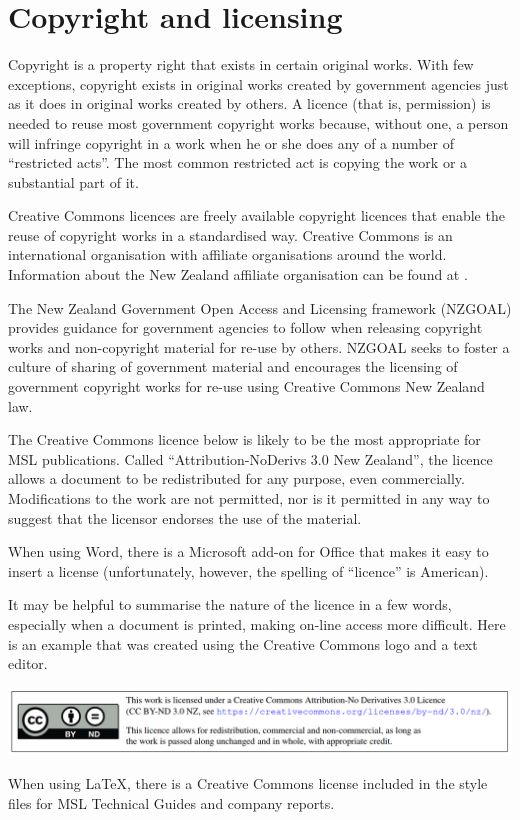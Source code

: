 \section{Copyright and licensing}
Copyright is a property right that exists in certain original works. With few exceptions, copyright exists in original works created by government agencies just as it does in original works created by others. A licence (that is, permission) is needed to reuse most government copyright works because, without one, a person will infringe copyright in a work when he or she does any of a number of ``restricted acts''. The most common restricted act is copying the work or a substantial part of it.

Creative Commons licences are freely available copyright licences that enable the reuse of copyright works in a standardised way. Creative Commons is an international organisation with affiliate organisations around the world. Information about the New Zealand affiliate organisation can be found at \cite{CCNZ}. 

The New Zealand Government Open Access and Licensing framework (NZGOAL) \cite{NZGOAL} provides guidance for government agencies to follow when releasing copyright works and non-copyright material for re-use by others. NZGOAL seeks to foster a culture of sharing of government material and encourages the licensing of government copyright works for re-use using Creative Commons New Zealand law.
 
The Creative Commons licence below is likely to be the most appropriate for MSL publications. Called ``Attribution-NoDerivs 3.0 New Zealand'', the licence allows a document to be redistributed for any purpose, even commercially. Modifications to the work are not permitted, nor is it permitted in any way to suggest that the licensor endorses the use of the material. 

When using Word, there is a Microsoft add-on for Office that makes it easy to insert a license (unfortunately, however, the spelling of ``licence'' is American).

It may be helpful to summarise the nature of the licence in a few words, especially when a document is printed, making on-line access more difficult. Here is an example that was created using the Creative Commons logo and a text editor.
\begin{center}
\includegraphics[scale=.41]{pictures/cc_license}
\end{center}

When using LaTeX, there is a Creative Commons license included in the style files for MSL Technical Guides and company reports.